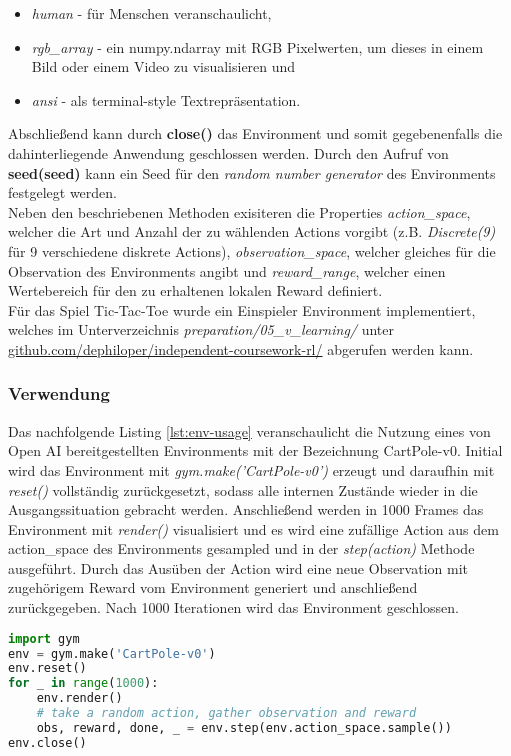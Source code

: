 \documentclass[11pt]{scrartcl}
\begin{document}
\begin{itemize}
\itemsep0pt
\item \textit{human} - für Menschen veranschaulicht, 
\item \textit{rgb\_array} - ein numpy.ndarray mit RGB Pixelwerten, um dieses in einem Bild oder einem 
Video zu visualisieren und 
\item \textit{ansi} - als terminal-style Textrepräsentation.
\end{itemize}
\noindent
Abschließend kann durch \textbf{close()} das Environment und somit gegebenenfalls die 
dahinterliegende Anwendung geschlossen werden. Durch den Aufruf von 
\textbf{seed(seed)} kann ein Seed für den \textit{random number generator}
des Environments festgelegt werden.\\

Neben den beschriebenen Methoden exisiteren die Properties \textit{action\_space}, welcher die
Art und Anzahl der zu wählenden Actions vorgibt (z.B. \textit{Discrete(9)} für 9 verschiedene
diskrete Actions), \textit{observation\_space}, welcher gleiches für die Observation des
Environments angibt und \textit{reward\_range}, welcher einen Wertebereich für den zu erhaltenen
lokalen Reward definiert.\\
Für das Spiel Tic-Tac-Toe wurde ein Einspieler Environment implementiert, welches im Unterverzeichnis
\textit{preparation/05\_v\_learning/} unter \url{github.com/dephiloper/independent-coursework-rl/}
abgerufen werden kann.  %


\subsubsection{Verwendung}
Das nachfolgende Listing \autoref{lst:env-usage} veranschaulicht die Nutzung eines von Open AI
bereitgestellten Environments mit der Bezeichnung CartPole-v0. Initial wird das Environment
mit \textit{gym.make('CartPole-v0')} erzeugt und daraufhin mit \textit{reset()} vollständig
zurückgesetzt, sodass alle internen Zustände wieder in die Ausgangssituation gebracht werden. 
Anschließend werden in 1000 Frames das Environment mit \textit{render()} visualisiert und es
wird eine zufällige Action aus dem action\_space des Environments gesampled und in der
\textit{step(action)} Methode ausgeführt. Durch das Ausüben der Action wird eine neue
Observation mit zugehörigem Reward vom Environment generiert und anschließend zurückgegeben.
Nach 1000 Iterationen wird das Environment geschlossen. 
\begin{lstlisting}[language=Python, caption=environment usage, label=lst:env-usage]
import gym
env = gym.make('CartPole-v0')
env.reset()
for _ in range(1000):
    env.render()
    # take a random action, gather observation and reward
    obs, reward, done, _ = env.step(env.action_space.sample())
env.close()
\end{lstlisting}
\end{document}
